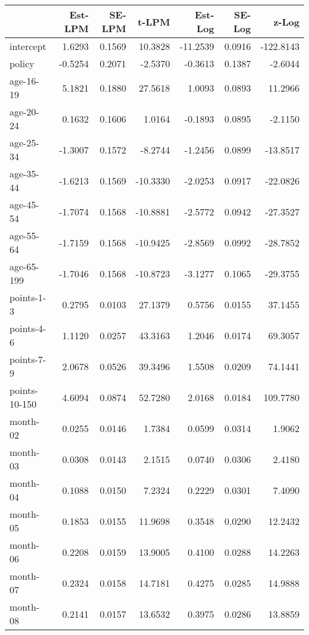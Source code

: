 \documentclass[10pt]{article}
\begin{document}

\begin{table}[ht]
\centering
\begin{tabular}{lrrrrrr}
  \hline
 & Est-LPM & SE-LPM & t-LPM & Est-Log & SE-Log & z-Log \\ 
  \hline
intercept & 1.6293 & 0.1569 & 10.3828 & -11.2539 & 0.0916 & -122.8143 \\ 
  policy & -0.5254 & 0.2071 & -2.5370 & -0.3613 & 0.1387 & -2.6044 \\ 
  age-16-19 & 5.1821 & 0.1880 & 27.5618 & 1.0093 & 0.0893 & 11.2966 \\ 
  age-20-24 & 0.1632 & 0.1606 & 1.0164 & -0.1893 & 0.0895 & -2.1150 \\ 
  age-25-34 & -1.3007 & 0.1572 & -8.2744 & -1.2456 & 0.0899 & -13.8517 \\ 
  age-35-44 & -1.6213 & 0.1569 & -10.3330 & -2.0253 & 0.0917 & -22.0826 \\ 
  age-45-54 & -1.7074 & 0.1568 & -10.8881 & -2.5772 & 0.0942 & -27.3527 \\ 
  age-55-64 & -1.7159 & 0.1568 & -10.9425 & -2.8569 & 0.0992 & -28.7852 \\ 
  age-65-199 & -1.7046 & 0.1568 & -10.8723 & -3.1277 & 0.1065 & -29.3755 \\ 
  points-1-3 & 0.2795 & 0.0103 & 27.1379 & 0.5756 & 0.0155 & 37.1455 \\ 
  points-4-6 & 1.1120 & 0.0257 & 43.3163 & 1.2046 & 0.0174 & 69.3057 \\ 
  points-7-9 & 2.0678 & 0.0526 & 39.3496 & 1.5508 & 0.0209 & 74.1441 \\ 
  points-10-150 & 4.6094 & 0.0874 & 52.7280 & 2.0168 & 0.0184 & 109.7780 \\ 
  month-02 & 0.0255 & 0.0146 & 1.7384 & 0.0599 & 0.0314 & 1.9062 \\ 
  month-03 & 0.0308 & 0.0143 & 2.1515 & 0.0740 & 0.0306 & 2.4180 \\ 
  month-04 & 0.1088 & 0.0150 & 7.2324 & 0.2229 & 0.0301 & 7.4090 \\ 
  month-05 & 0.1853 & 0.0155 & 11.9698 & 0.3548 & 0.0290 & 12.2432 \\ 
  month-06 & 0.2208 & 0.0159 & 13.9005 & 0.4100 & 0.0288 & 14.2263 \\ 
  month-07 & 0.2324 & 0.0158 & 14.7181 & 0.4275 & 0.0285 & 14.9888 \\ 
  month-08 & 0.2141 & 0.0157 & 13.6532 & 0.3975 & 0.0286 & 13.8859 \\ 

\end{tabular}
\end{table}
\end{document}
